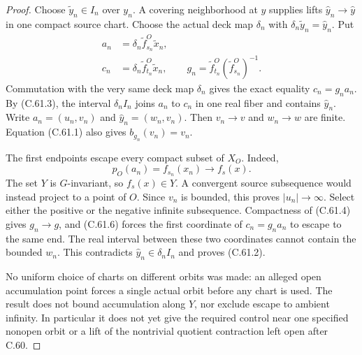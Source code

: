 \begin{proof}
Choose $\widetilde y_n\in I_n$ over $y_n$.
A covering neighborhood at $y$ supplies lifts
$\widehat y_n\to\widehat y$ in one compact source
chart. Choose the actual deck map $\delta_n$
with $\delta_n\widetilde y_n=\widehat y_n$.
Put
\[
 \begin{split}
 a_n&=\delta_n\widetilde f_{s_n}^O\widetilde x_n,\\
 c_n&=\delta_n\widetilde f_{t_n}^O\widetilde x_n,\qquad
 g_n=\widetilde f_{t_n}^O(\widetilde f_{s_n}^O)^{-1}.
 \end{split}                                             \tag{C.61.7}
\]
Commutation with the very same deck map
$\delta_n$ gives the exact equality $c_n=g_na_n$.
By (C.61.3), the interval $\delta_n I_n$ joins
$a_n$ to $c_n$ in one real fiber and contains
$\widehat y_n$.
Write
$a_n=(u_n,v_n)$ and
$\widehat y_n=(w_n,v_n)$.
Then $v_n\to v$ and $w_n\to w$ are finite.
Equation (C.61.1) also gives $b_{g_n}(v_n)=v_n$.

The first endpoints escape every compact subset
of $X_O$. Indeed,
\[
                 p_O(a_n)=f_{s_n}(x_n)\longrightarrow f_s(x).
 \]
The set $Y$ is $G$-invariant, so $f_s(x)\in Y$.
A convergent source subsequence would instead
project to a point of $O$.
Since $v_n$ is bounded, this proves
$|u_n|\to\infty$. Select either the positive
or the negative infinite subsequence.
Compactness of (C.61.4) gives $g_n\to g$,
and (C.61.6) forces the first coordinate of
$c_n=g_na_n$ to escape to the same end.
The real interval between these two coordinates
cannot contain the bounded $w_n$.
This contradicts
$\widehat y_n\in\delta_n I_n$ and proves
(C.61.2).

No uniform choice of charts on different
orbits was made: an alleged open accumulation
point forces a single actual orbit before
any chart is used.
The result does not bound accumulation along
$Y$, nor exclude escape to ambient infinity.
In particular it does not yet give the required
control near one specified nonopen orbit or
a lift of the nontrivial quotient contraction
left open after C.60.
\end{proof}
